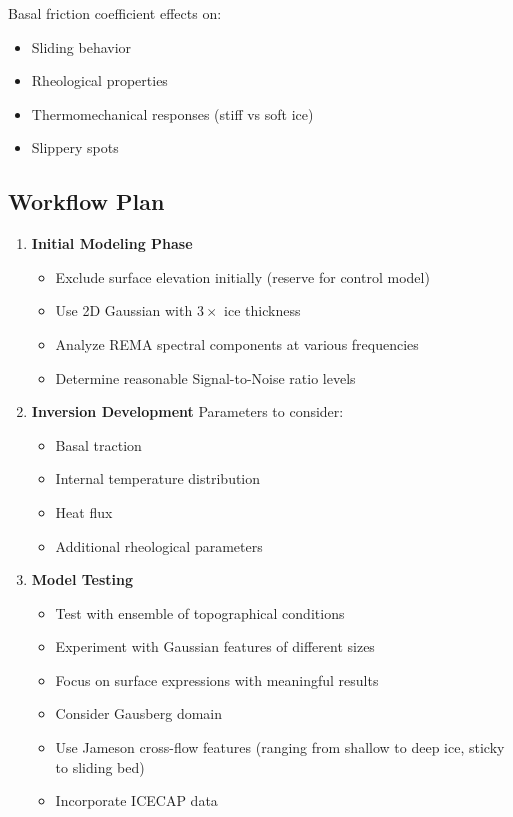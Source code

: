 Basal friction coefficient effects on:
\begin{itemize}
    \item Sliding behavior
    \item Rheological properties
    \item Thermomechanical responses (stiff vs soft ice)
    \item Slippery spots
    \end{itemize}


\subsection*{Workflow Plan}

\begin{enumerate}
\item\textbf{Initial Modeling Phase}
    \begin{itemize}
    \item Exclude surface elevation initially (reserve for control model)
    \item Use 2D Gaussian with $3\times$ ice thickness
    \item Analyze REMA spectral components at various frequencies
    \item Determine reasonable Signal-to-Noise ratio levels
    \end{itemize}

\item\textbf{Inversion Development}
    Parameters to consider:
    \begin{itemize}
        \item Basal traction
        \item Internal temperature distribution
        \item Heat flux
        \item Additional rheological parameters
    \end{itemize}

\item\textbf{Model Testing}
    \begin{itemize}
    \item Test with ensemble of topographical conditions
    \item Experiment with Gaussian features of different sizes
    \item Focus on surface expressions with meaningful results
    \item Consider Gausberg domain
    \item Use Jameson cross-flow features (ranging from shallow to deep ice, sticky to sliding bed)
    \item Incorporate ICECAP data
    \end{itemize}
\end{enumerate}
